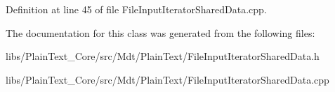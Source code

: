 Definition at line 45 of file File\+Input\+Iterator\+Shared\+Data.\+cpp.



The documentation for this class was generated from the following files\+:\begin{DoxyCompactItemize}
\item 
libs/\+Plain\+Text\+\_\+\+Core/src/\+Mdt/\+Plain\+Text/File\+Input\+Iterator\+Shared\+Data.\+h\item 
libs/\+Plain\+Text\+\_\+\+Core/src/\+Mdt/\+Plain\+Text/File\+Input\+Iterator\+Shared\+Data.\+cpp\end{DoxyCompactItemize}
